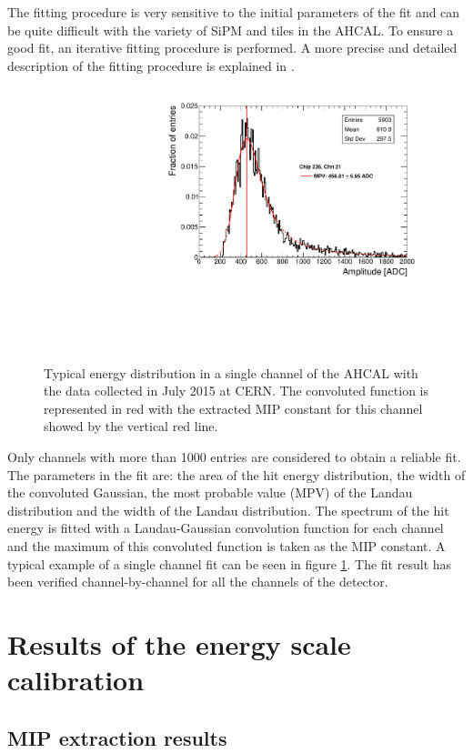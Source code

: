 The fitting procedure is very sensitive to the initial parameters of the fit and can be quite difficult with the variety of SiPM and tiles in the AHCAL. To ensure a good fit, an iterative fitting procedure is performed. A more precise and detailed description of the fitting procedure is explained in \cite{FabianThesis, SarahMaster}.

\begin{figure}[htbp!]
	\centering
	\includegraphics[width=0.6\linewidth]{../Thesis_Plots/EnergyCalib/Plots/ExampleMIP_Module3.pdf}
	\caption{Typical energy distribution in a single channel of the AHCAL with the data collected in July 2015 at CERN. The convoluted function is represented in red with the extracted MIP constant for this channel showed by the vertical red line.} \label{fig:MIPFit}
\end{figure}

Only channels with more than 1000 entries are considered to obtain a reliable fit. The parameters in the fit are: the area of the hit energy distribution, the width of the convoluted Gaussian, the most probable value (MPV) of the Landau distribution and the width of the Landau distribution. The spectrum of the hit energy is fitted with a Laudau-Gaussian convolution function for each channel and the maximum of this convoluted function is taken as the MIP constant. A typical example of a single channel fit can be seen in figure \ref{fig:MIPFit}. The fit result has been verified channel-by-channel for all the channels of the detector.

\section{Results of the energy scale calibration}

\subsection{MIP extraction results}

